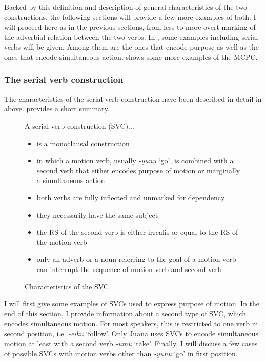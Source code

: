 Backed by this definition and description of general characteristics of the two constructions, the following sections will provide a few more examples of both. I will proceed here as in the previous sections, from less to more overt marking of the adverbial relation between the two verbs. In , some examples including serial verbs will be given. Among them are the ones that encode purpose as well as the ones that encode simultaneous action.   shows some more examples of the MCPC. 


\subsubsection{The serial verb construction}\label{sec:SerialVerbs}

The characteristics of the serial verb construction have been described in detail in  above.  provides a short summary.

\begin{figure}
%
%
A serial verb construction (SVC)... 
\begin{itemize}
\item is a monoclausal construction
\item in which a motion verb, usually \textit{-yunu} ‘go’, is combined with a second verb that either encodes purpose of motion or marginally a simultaneous action
\item both verbs are fully inflected and unmarked for dependency
\item they necessarily have the same subject
\item the RS of the second verb is either irrealis or equal to the RS of the motion verb
\item only an adverb or a noun referring to the goal of a motion verb can interrupt the sequence of motion verb and second verb
\end{itemize}
%
\caption{Characteristics of the SVC}
\label{fig:SVC}
\end{figure}

I will first give some examples of SVCs used to express purpose of motion. In the end of this section, I provide information about a second type of SVC, which encodes simultaneous motion. For most speakers, this is restricted to one verb in second position, i.e. \textit{-eiku} ‘follow’. Only Juana uses SVCs to encode simultaneous motion at least with a second verb \textit{-umu} ‘take’. Finally, I will discuss a few cases of possible SVCs with motion verbs other than \textit{-yunu} ‘go’ in first position.

